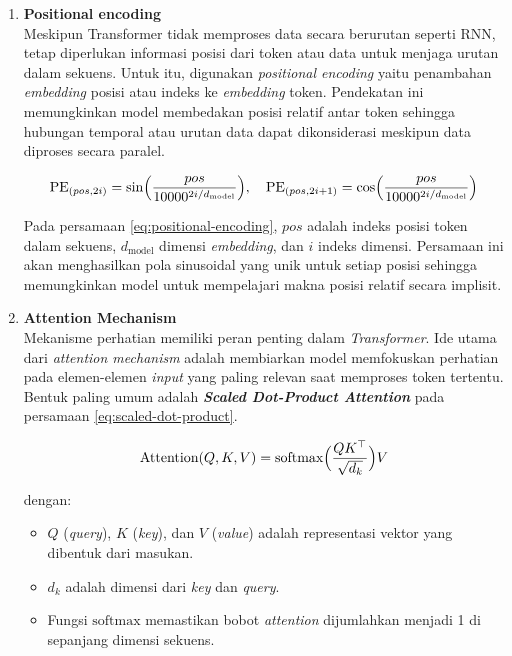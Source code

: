 \begin{enumerate}
\item \textbf{Positional encoding} \\
Meskipun Transformer tidak memproses data secara berurutan seperti RNN, tetap diperlukan informasi posisi dari token atau data untuk menjaga urutan dalam sekuens. Untuk itu, digunakan \textit{positional encoding} yaitu penambahan \textit{embedding} posisi atau indeks ke \textit{embedding} token. Pendekatan ini memungkinkan model membedakan posisi relatif antar token sehingga hubungan temporal atau urutan data dapat dikonsiderasi meskipun data diproses secara paralel.

\begin{equationfloat}
\begin{equation}
\text{PE}_{(pos,2i)} = \sin\Bigl(\frac{pos}{10000^{2i/d_{\text{model}}}}\Bigr), 
\quad
\text{PE}_{(pos,2i+1)} = \cos\Bigl(\frac{pos}{10000^{2i/d_{\text{model}}}}\Bigr)
\end{equation}
\caption{Persamaan \textit{positional encoding}}
\label{eq:positional-encoding}
\end{equationfloat}

Pada persamaan \ref{eq:positional-encoding}, \(pos\) adalah indeks posisi token dalam sekuens, \(d_{\text{model}}\) dimensi \textit{embedding}, dan \(i\) indeks dimensi. Persamaan ini akan menghasilkan pola sinusoidal yang unik untuk setiap posisi sehingga memungkinkan model untuk mempelajari makna posisi relatif secara implisit.

\item \textbf{Attention Mechanism} \\
Mekanisme perhatian \parencite{Bahdanau2015,Luong2015} memiliki peran penting dalam \textit{Transformer}. Ide utama dari \textit{attention mechanism} adalah membiarkan model memfokuskan perhatian pada elemen-elemen \textit{input} yang paling relevan saat memproses token tertentu. Bentuk paling umum adalah \textbf{\textit{Scaled Dot-Product Attention}} pada persamaan \ref{eq:scaled-dot-product}. 

\begin{equationfloat}
\begin{equation}
\text{Attention}(Q,K,V) 
= \text{softmax}\Bigl(\frac{QK^\top}{\sqrt{d_k}}\Bigr)V
\end{equation}
\caption{\textit{Scaled Dot-Product Attention}}
\label{eq:scaled-dot-product}
\end{equationfloat}

dengan:
\begin{itemize}
    \item \(Q\) (\textit{query}), \(K\) (\textit{key}), dan \(V\) (\textit{value}) adalah representasi vektor yang dibentuk dari masukan.
    \item \(d_k\) adalah dimensi dari \textit{key} dan \textit{query}.
    \item Fungsi \(\text{softmax}\) memastikan bobot \textit{attention} dijumlahkan menjadi 1 di sepanjang dimensi sekuens.
\end{itemize}


\end{enumerate}
